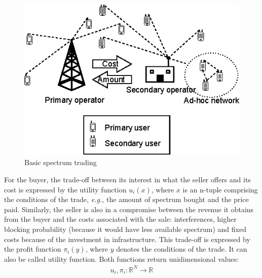 \begin{figure}[!ht]
  \begin{center}
  \includegraphics[scale=1.25]{Fig1.eps}
  \end{center}
  \caption{Basic spectrum trading}
   \label{fig:BasicMarket}
\end{figure}

For the buyer, the trade-off between its interest in what the seller offers and its cost is expressed by the utility function $u_i(x)$, where $x$ is an n-tuple comprising the conditions of the trade, \textit{e.g.,} the amount of spectrum bought and the price paid. Similarly, the seller is also in a compromise between the revenue it obtains from the buyer and the costs associated with the sale: interferences, higher blocking probability (because it would have less available spectrum) and fixed costs because of the investment in infrastructure. This trade-off is expressed by the profit function $\pi_i(y)$, where $y$ denotes the conditions of the trade. It can also be called utility function. Both functions return unidimensional values:
\begin{equation}
\begin {array} {lcl}
u_i, \pi_i :  \mathbb{R}^N \rightarrow \mathbb{R}
\end{array}
\end{equation}

